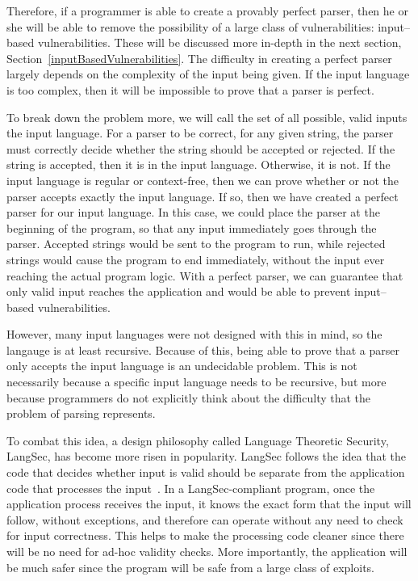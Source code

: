 Therefore, if a programmer is able to create a provably perfect parser, then he or she will be able to remove the possibility of a large class of vulnerabilities: input--based vulnerabilities.  These will be discussed more in-depth in the next section, Section~\ref{inputBasedVulnerabilities}.  The difficulty in creating a perfect parser largely depends on the complexity of the input being given.  If the input language is too complex, then it will be impossible to prove that a parser is perfect.

To break down the problem more, we will call the set of all possible, valid inputs the input language.  For a parser to be correct, for any given string, the parser must correctly decide whether the string should be accepted or rejected.  If the string is accepted, then it is in the input language.  Otherwise, it is not.  If the input language is regular or context-free, then we can prove whether or not the parser accepts exactly the input language.  If so, then we have created a perfect parser for our input language.  In this case, we could place the parser at the beginning of the program, so that any input immediately goes through the parser.  Accepted strings would be sent to the program to run, while rejected strings would cause the program to end immediately, without the input ever reaching the actual program logic.  With a perfect parser, we can guarantee that only valid input reaches the application and would be able to prevent input--based vulnerabilities.

However, many input languages were not designed with this in mind, so the langauge is at least recursive.  Because of this, being able to prove that a parser only accepts the input language is an undecidable problem.  This is not necessarily because a specific input language needs to be recursive, but more because programmers do not explicitly think about the difficulty that the problem of parsing represents.

To combat this idea, a design philosophy called Language Theoretic Security, LangSec, has become more risen in popularity.  LangSec follows the idea that the code that decides whether input is valid should be separate from the application code that processes the input~\cite{langsec_language-theoretic_security}.  In a LangSec-compliant program, once the application process receives the input, it knows the exact form that the input will follow, without exceptions, and therefore can operate without any need to check for input correctness.  This helps to make the processing code cleaner since there will be no need for ad-hoc validity checks.  More importantly, the application will be much safer since the program will be safe from a large class of exploits.

